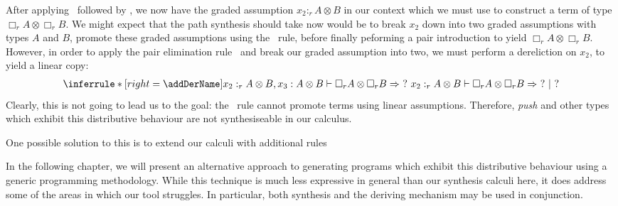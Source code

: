 After applying \addAbsName\ followed by \addUnboxName, we now have the graded assumption $x_2 :_r A \otimes B$
in our context which we must use to construct a term of type $\Box_r A \otimes \Box_r B$. We might expect that 
the path synthesis should take now would be to break $x_2$ down into two graded assumptions with types $A$ and $B$, 
promote these graded assumptions using the \addBoxName\ rule, before finally peforming a pair introduction to yield 
$\Box_r A \otimes \Box_r B$. However, in order to apply the pair elimination rule \addPairElimName\  
and break our graded assumption into two, we must perform a dereliction on $x_2$, to yield a linear copy: 
\begin{align*}
  \inferrule*[right=\addDerName]
      {x_2 :_r A \otimes B, x_3 : A \otimes B \vdash \Box_r A \otimes \Box_r B \Rightarrow\ ?\ }
      { x_2 :_r A \otimes B \vdash \Box_r A \otimes \Box_r B \Rightarrow\ ?\ |\ ? }
\end{align*}
Clearly, this is not going to lead us to the goal: the \addBoxName\ rule cannot promote terms using linear assumptions. 
Therefore, \textit{push} and other types which exhibit this distributive behaviour are not synthesiseable in our calculus.

One possible solution to this is to extend our calculi with additional rules 


In the following chapter, we will present an alternative approach to generating programs which 
exhibit this distributive behaviour using a generic programming methodology. While this technique is much less
expressive in general than our synthesis calculi here, it does address some of the areas in which our tool 
struggles. In particular, both synthesis and the deriving mechanism may be used in conjunction. 


